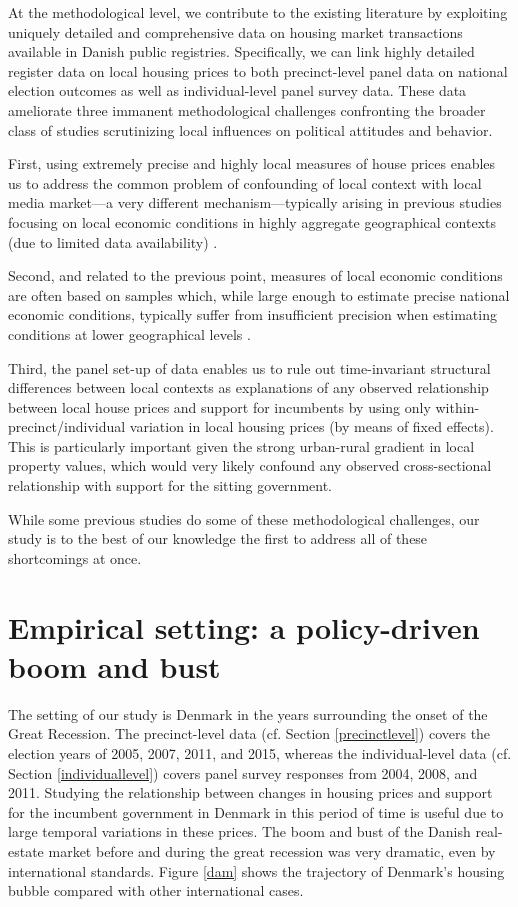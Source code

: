 \documentclass[12pt,a4paper]{article}
\begin{document}
At the methodological level, we contribute to the existing literature by exploiting uniquely detailed and comprehensive data on housing market transactions available in Danish public registries. Specifically, we can link highly detailed register data on local housing prices to both precinct-level panel data on national election outcomes as well as individual-level panel survey data. These data ameliorate three immanent methodological challenges confronting the broader class of studies scrutinizing local influences on political attitudes and behavior.

First, using extremely precise and highly local measures of house prices enables us to address the common problem of confounding of local context with local media market—a very different mechanism—typically arising in previous studies focusing on local economic conditions in highly aggregate geographical contexts (due to limited data availability) \citep[][]{bisgaard2016reconsidering}.  

Second, and related to the previous point,  measures of local economic conditions are often based on samples which, while large enough to estimate precise national economic conditions, typically suffer from insufficient precision when estimating conditions at lower geographical levels \citep[][]{healy2014presidential}. 

Third, the panel set-up of data enables us to rule out time-invariant structural differences between local contexts as explanations of any observed relationship between local house prices and support for incumbents by using only within-precinct/individual variation in local housing prices (by means of fixed effects). This is particularly important given the strong urban-rural gradient in local property values, which would very likely confound any observed cross-sectional relationship with support for the sitting government. 

While some previous studies do  some of these methodological challenges, our study is to the best of our knowledge the first to address all of these shortcomings at once. 



\section{Empirical setting: a policy-driven boom and bust}

The setting of our study is Denmark in the years surrounding the onset of the Great Recession. The precinct-level data (cf. Section \ref{precinctlevel}) covers the election years of 2005, 2007, 2011, and 2015, whereas the individual-level data (cf. Section \ref{individuallevel}) covers panel survey responses from 2004, 2008, and 2011. Studying the relationship between changes in housing prices and support for the incumbent government in Denmark in this period of time is useful due to large temporal variations in these prices. The boom and bust of the Danish real-estate market before and during the great recession was very dramatic, even by international standards. Figure \ref{dam} shows the trajectory of Denmark's housing bubble compared with other international cases.
\end{document}

